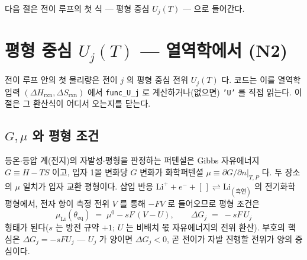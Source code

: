 \documentclass[11pt,a4paper]{article}
\newcommand{\eq}{\mathrm{eq}}
\newcommand{\rxn}{\mathrm{rxn}}
\newcommand{\code}[1]{\texttt{#1}}
\begin{document}
다음 절은 전이 루프의 첫 식 — 평형 중심 $U_j(T)$ — 으로 들어간다.

\section{평형 중심 $U_j(T)$ — 열역학에서 (N2)}\label{sec:center}
전이 루프 안의 첫 물리량은 전이 $j$ 의 평형 중심 전위 $U_j(T)$ 다. 코드는 이를 열역학 입력 $(\Delta H_\rxn,\Delta S_\rxn)$
에서 \code{func\_U\_j} 로 계산하거나(없으면) \code{'U'} 를 직접 읽는다. 이 절은 그 환산식이 어디서 오는지를 닫는다.

\subsection{$G,\mu$ 와 평형 조건}
등온$\cdot$등압 계(전지)의 자발성$\cdot$평형을 판정하는 퍼텐셜은 Gibbs 자유에너지 $G\equiv H-TS$ 이고, 입자 1몰 변화당
$G$ 변화가 화학퍼텐셜 $\mu\equiv\partial G/\partial n|_{T,P}$ 다. 두 장소의 $\mu$ 일치가 입자 교환 평형이다. 삽입 반응
$\mathrm{Li}^++e^-+[\,]\rightleftharpoons\mathrm{Li}_{(\text{흑연})}$ 의 전기화학 평형에서, 전자 항이 측정 전위 $V$ 를
통해 $-FV$ 로 들어오므로 평형 조건은
\begin{equation}
\mu_\mathrm{Li}(\theta_\eq)\;=\;\mu^0-sF\,(V-U),
\qquad \Delta G_j\;=\;-sF\,U_j
\label{eq:eqcond}
\end{equation}
형태가 된다($s$ 는 방전 규약 $+1$; $U$ 는 비배치 몫 자유에너지의 전위 환산). 부호의 핵심은 $\Delta G_j=-sFU_j$ —
$U_j$ 가 양이면 $\Delta G_j<0$, 곧 전이가 자발 진행할 전위가 양의 중심이다.
\end{document}
